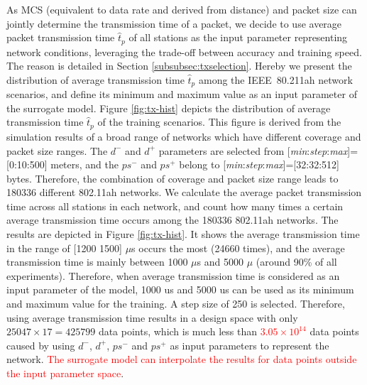 



 As MCS (equivalent to data rate and derived from distance) and packet size can jointly determine the transmission time of a packet, we decide to use average packet transmission time $\hat{t}_p$ of all stations as the input parameter representing network conditions, leveraging the trade-off between accuracy and training speed. %
The reason is detailed in Section \ref{subsubsec:txselection}. Hereby we present the distribution of average transmission time $\hat{t}_p$ among the IEEE~80.211ah network scenarios, and define its minimum and maximum value as an input parameter of the surrogate model. Figure \ref{fig:tx-hist} depicts the 
distribution of average transmission time $\hat{t}_p$ of the training scenarios.  This figure is derived from the simulation results of a broad range of networks which have different coverage and packet size ranges. The $d^-$ and $d^+$ parameters are selected from [\textit{min}:\textit{step}:\textit{max}]=[0:10:500] meters, and the $ps^-$ and $ps^+$ belong to  [\textit{min}:\textit{step}:\textit{max}]=[32:32:512] bytes. Therefore, the combination of coverage and packet size range leads to 180336 different 802.11ah networks. We calculate the average packet transmission time across all stations in each network, and count how many times a certain average transmission time occurs among the 180336 802.11ah networks. The results are depicted in Figure \ref{fig:tx-hist}. It shows the average transmission time in the range of [1200 1500] $\mu$s occurs the most (24660 times),  and the average transmission time is mainly between 1000 $\mu$s and 5000 $\mu$ (around 90\% of all experiments). Therefore,  when average transmission time is considered as an input parameter of the model, 1000 us and 5000 us can be used as its minimum and maximum value for the training. A step size of 250 is selected. Therefore, using average transmission time results in a design space with only $25047 \times 17 = 425799$ data points, which is much less than  \textcolor{red}{$3.05 \times 10^{14}$} data points caused by using $d^-$, $d^+$, $ps^-$ and $ps^+$ as input parameters to represent the network. \textcolor{red}{The surrogate model can interpolate the results for data points outside the input parameter space}.
 

